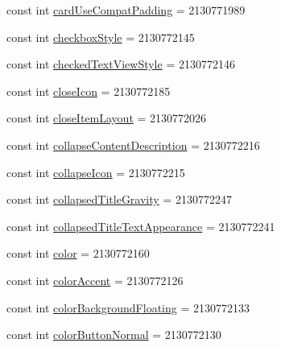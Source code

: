\begin{DoxyCompactItemize}
\item 
const int \mbox{\hyperlink{class_f_w_p_s___app_1_1_droid_1_1_resource_1_1_attribute_a633e6843eed882d25d2b335264d53a51}{card\+Use\+Compat\+Padding}} = 2130771989
\item 
const int \mbox{\hyperlink{class_f_w_p_s___app_1_1_droid_1_1_resource_1_1_attribute_aae56ba05019587b1758665fba1f1d6af}{checkbox\+Style}} = 2130772145
\item 
const int \mbox{\hyperlink{class_f_w_p_s___app_1_1_droid_1_1_resource_1_1_attribute_a080dbacb3e8bbb27e5a7331b82ffeada}{checked\+Text\+View\+Style}} = 2130772146
\item 
const int \mbox{\hyperlink{class_f_w_p_s___app_1_1_droid_1_1_resource_1_1_attribute_a689682552941e033394bc7709b6db75d}{close\+Icon}} = 2130772185
\item 
const int \mbox{\hyperlink{class_f_w_p_s___app_1_1_droid_1_1_resource_1_1_attribute_a710f6bce658e3d91a053e114cd37375c}{close\+Item\+Layout}} = 2130772026
\item 
const int \mbox{\hyperlink{class_f_w_p_s___app_1_1_droid_1_1_resource_1_1_attribute_a29b7cd50b25fdbc5ee10b899d50bb992}{collapse\+Content\+Description}} = 2130772216
\item 
const int \mbox{\hyperlink{class_f_w_p_s___app_1_1_droid_1_1_resource_1_1_attribute_af1f22f80a58e09183240dbaeceb378ab}{collapse\+Icon}} = 2130772215
\item 
const int \mbox{\hyperlink{class_f_w_p_s___app_1_1_droid_1_1_resource_1_1_attribute_a9a76dbc8e8be92b6b27e791ad51db491}{collapsed\+Title\+Gravity}} = 2130772247
\item 
const int \mbox{\hyperlink{class_f_w_p_s___app_1_1_droid_1_1_resource_1_1_attribute_a7ff326b3313faf61fd0b03add4286ed2}{collapsed\+Title\+Text\+Appearance}} = 2130772241
\item 
const int \mbox{\hyperlink{class_f_w_p_s___app_1_1_droid_1_1_resource_1_1_attribute_aa314e39c74edd1a4f05d75503c039546}{color}} = 2130772160
\item 
const int \mbox{\hyperlink{class_f_w_p_s___app_1_1_droid_1_1_resource_1_1_attribute_af756cac2ce71fbf398e0fee985c67b9f}{color\+Accent}} = 2130772126
\item 
const int \mbox{\hyperlink{class_f_w_p_s___app_1_1_droid_1_1_resource_1_1_attribute_a04e5a0f2820d5ee9aa1743a94b652b32}{color\+Background\+Floating}} = 2130772133
\item 
const int \mbox{\hyperlink{class_f_w_p_s___app_1_1_droid_1_1_resource_1_1_attribute_a8a18d85e046a974ac3d2f3b940a901f3}{color\+Button\+Normal}} = 2130772130

\end{DoxyCompactItemize}
